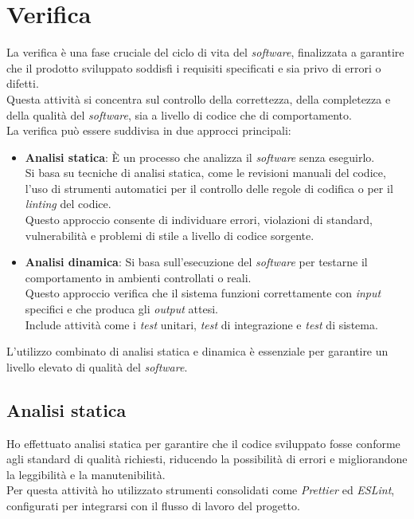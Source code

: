\pagebreak
\section{Verifica}
\label{sez:verifica}

La verifica è una fase cruciale del ciclo di vita del \textit{software}, finalizzata a garantire che il prodotto sviluppato soddisfi i requisiti specificati e sia privo di errori o difetti.\\
Questa attività si concentra sul controllo della correttezza, della completezza e della qualità del \textit{software}, sia a livello di codice che di comportamento.\\

\noindent La verifica può essere suddivisa in due approcci principali:

\begin{itemize}
\item \textbf{Analisi statica}:
È un processo che analizza il \textit{software} senza eseguirlo. \\
Si basa su tecniche di analisi statica, come le revisioni manuali del codice, l'uso di strumenti automatici per il controllo delle regole di codifica o per il \textit{linting} del codice. \\
Questo approccio consente di individuare errori, violazioni di standard, vulnerabilità e problemi di stile a livello di codice sorgente.  

\item \textbf{Analisi dinamica}:
Si basa sull’esecuzione del \textit{software} per testarne il comportamento in ambienti controllati o reali.\\
Questo approccio verifica che il sistema funzioni correttamente con \textit{input} specifici e che produca gli \textit{output} attesi. \\
Include attività come i \textit{test} unitari, \textit{test} di integrazione e \textit{test} di sistema.  
\end{itemize}

\noindent L’utilizzo combinato di analisi statica e dinamica è essenziale per garantire un livello elevato di qualità del \textit{software}. \\

\subsection{Analisi statica}
\label{subsec:analisi-statica}

Ho effettuato analisi statica per garantire che il codice sviluppato fosse conforme agli standard di qualità richiesti, riducendo la possibilità di errori e migliorandone la leggibilità e la manutenibilità.\\
Per questa attività ho utilizzato strumenti consolidati come \textit{Prettier} ed \textit{ESLint}, configurati per integrarsi con il flusso di lavoro del progetto.\\

